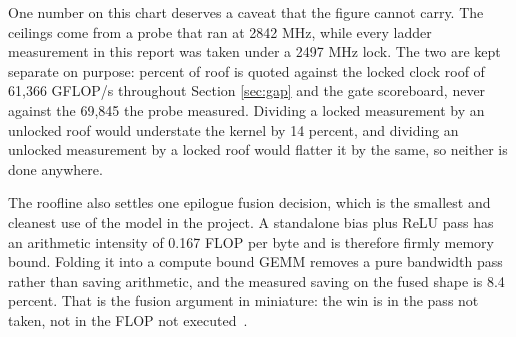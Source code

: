 One number on this chart deserves a caveat that the figure cannot carry. The
ceilings come from a probe that ran at 2842 MHz, while every ladder measurement in
this report was taken under a 2497 MHz lock. The two are kept separate on purpose:
percent of roof is quoted against the locked clock roof of 61,366 GFLOP/s
throughout Section \ref{sec:gap} and the gate scoreboard, never against the 69,845
the probe measured. Dividing a locked measurement by an unlocked roof would
understate the kernel by 14 percent, and dividing an unlocked measurement by a
locked roof would flatter it by the same, so neither is done anywhere.

The roofline also settles one epilogue fusion decision, which is the smallest and
cleanest use of the model in the project. A standalone bias plus ReLU pass has an
arithmetic intensity of 0.167 FLOP per byte and is therefore firmly memory bound.
Folding it into a compute bound GEMM removes a pure bandwidth pass rather than
saving arithmetic, and the measured saving on the fused shape is 8.4 percent. That
is the fusion argument in miniature: the win is in the pass not taken, not in the
FLOP not executed~\cite{dao2022}.
